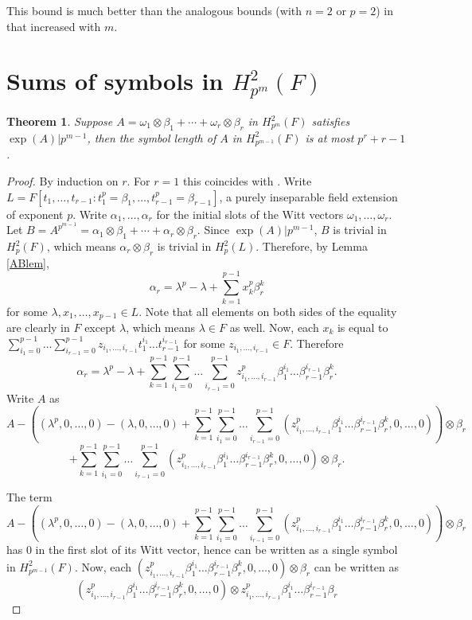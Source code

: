 \documentclass[preprint, 10pt, english]{elsarticle}
\newtheorem{thm}{Theorem}[section] %
\theoremstyle{definition}
\begin{document}
This bound is much better than the analogous bounds (with $n=2$ or $p=2$) in \cite{ChapmanFlorenceMcKinnie:2023} that increased with $m$.


\section{Sums of symbols in $H_{p^m}^2(F)$}


\begin{thm}\label{T4}
Suppose $A=\omega_1\otimes \beta_1+\cdots+\omega_r\otimes \beta_r$ in $H_{p^{m}}^2(F)$  satisfies $\exp(A)|p^{m-1}$, then the symbol length of $A$ in $H_{p^{m-1}}^2(F)$ is at most $p^r+r-1$.
\end{thm}

\begin{proof}
By induction on $r$. For $r=1$ this coincides with \cite[Proposition 5]{MammoneMerkurjev:1991}. Write $L=F[t_1,\dots,t_{r-1} : t_1^p=\beta_1,\dots,t_{r-1}^p=\beta_{r-1}]$, a purely inseparable field extension of exponent $p$.
Write $\alpha_1,\dots,\alpha_r$ for the initial slots of the Witt vectors $\omega_1,\dots,\omega_r$. Let $B = A^{p^{m-1}} = \alpha_1\otimes \beta_1+\cdots+\alpha_r\otimes \beta_r$. Since $\exp(A)| p^{m-1}$,  $B$ is trivial in $H_p^2(F)$, which means $\alpha_r \otimes \beta_r$ is trivial in $H_p^2(L)$.
Therefore, by Lemma \ref{ABlem},
$$\alpha_r=\lambda^p-\lambda+\sum_{k=1}^{p-1} x_k^p \beta_r^k$$
for some $\lambda,x_1,\dots,x_{p-1} \in L$. Note that all elements on both sides of the equality are clearly in $F$ except $\lambda$, which means $\lambda \in F$ as well.
Now, each $x_k$ is equal to $\sum_{i_1=0}^{p-1} \dots \sum_{i_{r-1}=0}^{p-1} z_{i_1,\dots,i_{r-1}} t_1^{i_1} \dots t_{r-1}^{i_{r-1}}$ for some $z_{i_1,\dots,i_{r-1}} \in F$. Therefore 
$$\alpha_r=\lambda^p-\lambda+\sum_{k=1}^{p-1} \sum_{i_1=0}^{p-1} \dots \sum_{i_{r-1}=0}^{p-1} z_{i_1,\dots,i_{r-1}}^p \beta_1^{i_1} \dots \beta_{r-1}^{i_{r-1}} \beta_r^k.$$
Write $A$ as 
$$A - \left((\lambda^p,0,\dots,0)-(\lambda,0,\dots,0)+\sum_{k=1}^{p-1} \sum_{i_1=0}^{p-1} \dots \sum_{i_{r-1}=0}^{p-1} (z_{i_1,\dots,i_{r-1}}^p \beta_1^{i_1} \dots \beta_{r-1}^{i_{r-1}} \beta_r^k,0,\dots,0)\right)\otimes \beta_r$$
$$+\sum_{k=1}^{p-1} \sum_{i_1=0}^{p-1} \dots \sum_{i_{r-1}=0}^{p-1} (z_{i_1,\dots,i_{r-1}}^p \beta_1^{i_1} \dots \beta_{r-1}^{i_{r-1}} \beta_r^k,0,\dots,0)\otimes \beta_r.$$

The term 
$$A - \left((\lambda^p,0,\dots,0)-(\lambda,0,\dots,0)+\sum_{k=1}^{p-1} \sum_{i_1=0}^{p-1} \dots \sum_{i_{r-1}=0}^{p-1} (z_{i_1,\dots,i_{r-1}}^p \beta_1^{i_1} \dots \beta_{r-1}^{i_{r-1}} \beta_r^k,0,\dots,0)\right)\otimes \beta_r$$ has 0 in the first slot of its Witt vector, hence can be written as a single symbol in $H_{p^{m-1}}^2(F)$.
Now, each $(z_{i_1,\dots,i_{r-1}}^p \beta_1^{i_1} \dots \beta_{r-1}^{i_{r-1}} \beta_r^k,0,\dots,0)\otimes \beta_r$ can be written as 
$$(z_{i_1,\dots,i_{r-1}}^p \beta_1^{i_1} \dots \beta_{r-1}^{i_{r-1}} \beta_r^k,0,\dots,0)\otimes z_{i_1,\dots,i_{r-1}}^p \beta_1^{i_1} \dots \beta_{r-1}^{i_{r-1}}\beta_r$$


\end{proof}
\end{document}
